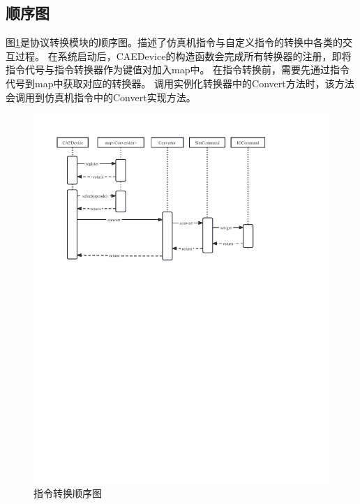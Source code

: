 \subsection{顺序图}
图\ref{seq2}是协议转换模块的顺序图。描述了仿真机指令与自定义指令的转换中各类的交互过程。
在系统启动后，CAEDevice的构造函数会完成所有转换器的注册，即将指令代号与指令转换器作为键值对加入map中。
在指令转换前，需要先通过指令代号到map中获取对应的转换器。
调用实例化转换器中的Convert方法时，该方法会调用到仿真机指令中的Convert实现方法。
\begin{figure}[h!]
    \begin{center}
        \includegraphics[width=\textwidth]{pictures/sequence2.pdf}
        \caption{指令转换顺序图}
        \label{seq2}
    \end{center}
\end{figure}
